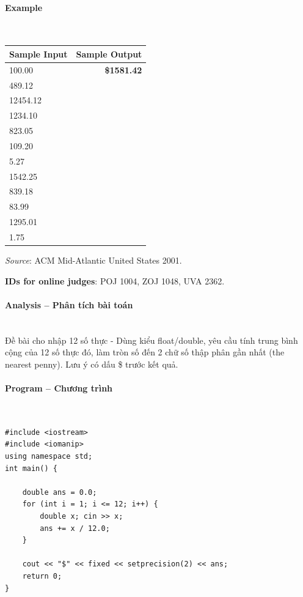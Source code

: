 \documentclass{article}
\begin{document}
\paragraph{Example}\mbox{} \\

\begin{table}[h]
    \centering
    \begin{tabular}{|l|r|}
        \hline
        \textbf{Sample Input} & \textbf{Sample Output} \\
        \hline
        100.00    &  \textbf{\$1581.42} \\ 
        489.12    &  \\ 
        12454.12  &  \\ 
        1234.10   &  \\ 
        823.05    &  \\ 
        109.20    &  \\ 
        5.27      &  \\ 
        1542.25   &  \\ 
        839.18    &  \\ 
        83.99     &  \\ 
        1295.01   &  \\ 
        1.75      &  \\ \hline
    \end{tabular}
\end{table}

\textit{Source}: ACM Mid-Atlantic United States 2001.

\textbf{IDs for online judges}: POJ 1004, ZOJ 1048, UVA 2362.


\paragraph{Analysis -- Phân tích bài toán} \mbox{} \\

Đề bài cho nhập 12 số thực - Dùng kiểu float/double, yêu cầu tính trung bình cộng của 12 số thực đó, làm tròn số đến 2 chữ số thập phân gần nhất (the nearest penny). Lưu ý có dấu \$ trước kết quả.

\paragraph{Program -- Chương trình} \mbox{} \\


\begin{lstlisting}
#include <iostream>
#include <iomanip>
using namespace std;
int main() {

	double ans = 0.0;
	for (int i = 1; i <= 12; i++) {
		double x; cin >> x;
		ans += x / 12.0; 
	}

	cout << "$" << fixed << setprecision(2) << ans;
	return 0;
}
\end{lstlisting}
\end{document}
